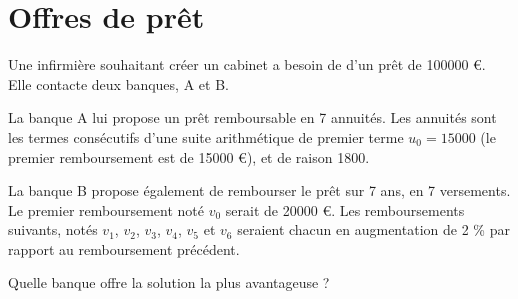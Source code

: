 \section{Offres de prêt}

Une infirmière souhaitant créer un cabinet a besoin de d'un prêt de \num{100000} €. Elle contacte deux banques, A et B.

\begin{questions}
	\question La banque A lui propose un prêt remboursable en 7 annuités. Les annuités sont les termes consécutifs d'une suite arithmétique de premier terme $u_0 = \num{15000}$ (le premier remboursement est de \num{15000} €), et de raison \num{1800}.
	

	\question La banque B propose également de rembourser le prêt sur 7 ans, en 7 versements. Le premier remboursement noté $v_0$ serait de \num{20000} €. Les remboursements suivants, notés $v_1$, $v_2$, $v_3$, $v_4$, $v_5$ et $v_6$ seraient chacun en augmentation de 2 \% par rapport au remboursement précédent.
	

	\question Quelle banque offre la solution la plus avantageuse ?
\end{questions}